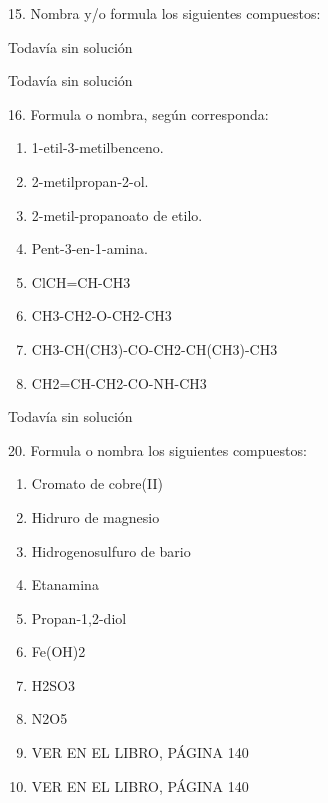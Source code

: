 \documentclass{article}
\begin{document}
\begin{exercise}
  15. Nombra y/o formula los siguientes compuestos:
\end{exercise}

\begin{solution}[print=false]
  Todavía sin solución
\end{solution}

\begin{exercise}
  \begin{enumerate}
  \end{enumerate}
\end{exercise}

\begin{solution}[print=false]
  Todavía sin solución
\end{solution}

\begin{exercise}
  16. Formula o nombra, según corresponda:
  \begin{enumerate}
    \item 1-etil-3-metilbenceno.
    \item 2-metilpropan-2-ol.
    \item 2-metil-propanoato de etilo.
    \item Pent-3-en-1-amina.
    \item ClCH=CH-CH3
    \item CH3-CH2-O-CH2-CH3
    \item CH3-CH(CH3)-CO-CH2-CH(CH3)-CH3
    \item CH2=CH-CH2-CO-NH-CH3
  \end{enumerate}
\end{exercise}

\begin{solution}[print=false]
  Todavía sin solución
\end{solution}

\begin{exercise}
  20. Formula o nombra los siguientes compuestos:
  \begin{enumerate}
    \item Cromato de cobre(II)
    \item Hidruro de magnesio
    \item Hidrogenosulfuro de bario
    \item Etanamina
    \item Propan-1,2-diol
    \item Fe(OH)2
    \item H2SO3
    \item N2O5
    \item VER EN EL LIBRO, PÁGINA 140
    \item VER EN EL LIBRO, PÁGINA 140
  \end{enumerate}
\end{exercise}
\end{document}
